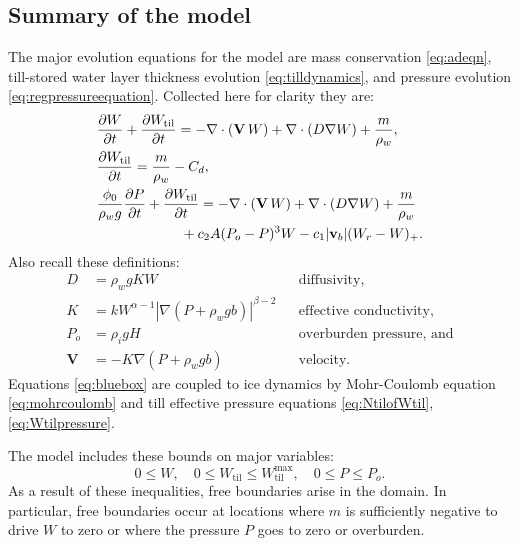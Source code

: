 \documentclass[gmd]{copernicus}   %
\begin{document}
\subsection{Summary of the model}  The major evolution equations for the model are mass conservation \eqref{eq:adeqn}, till-stored water layer thickness evolution \eqref{eq:tilldynamics}, and pressure evolution \eqref{eq:regpressureequation}.  Collected here for clarity they are:
\begin{align}
&\frac{\partial W}{\partial t} + \frac{\partial W_{\text{til}}}{\partial t} = - \nabla\cdot\left(\mathbf{V}\, W\right) + \nabla\cdot \left(D \nabla W\right) + \frac{m}{\rho_w}, \label{eq:bluebox} \\
&\frac{\partial W_{\text{til}}}{\partial t} = \frac{m}{\rho_w} - C_d, \notag \\
&\frac{\phi_0}{\rho_w g} \frac{\partial P}{\partial t} + \frac{\partial W_{\text{til}}}{\partial t} = - \nabla\cdot\left(\mathbf{V}\, W\right) + \nabla\cdot \left(D \nabla W\right) + \frac{m}{\rho_w} \notag \\
& \qquad \qquad \qquad + c_2 A (P_o - P)^3 W - c_1 |\mathbf{v}_b| (W_r - W)_+. \notag
\end{align}
Also recall these definitions:
\begin{align*}
D    &= \rho_w g K W && \text{diffusivity,} \\
K    &= k W^{\alpha-1} \left|\nabla(P+\rho_w g b)\right|^{\beta-2} && \text{effective conductivity,} \\
P_o  &= \rho_i g H && \text{overburden pressure, and} \\
\mathbf{V}  &= - K \nabla\left(P + \rho_w g b\right) && \text{velocity}.
\end{align*}
Equations \eqref{eq:bluebox} are coupled to ice dynamics by Mohr-Coulomb equation \eqref{eq:mohrcoulomb} and till effective pressure equations \eqref{eq:NtilofWtil}, \eqref{eq:Wtilpressure}.

The model includes these bounds on major variables:
\begin{equation}
0\le W, \quad 0\le W_{\text{til}} \le W_{\text{til}}^{\text{max}}, \quad 0 \le P \le P_o.  \label{eq:allbounds}
\end{equation}
As a result of these inequalities, free boundaries arise in the domain.  In particular, free boundaries occur at locations where $m$ is sufficiently negative to drive $W$ to zero or where the pressure $P$ goes to zero or overburden.
\end{document}
